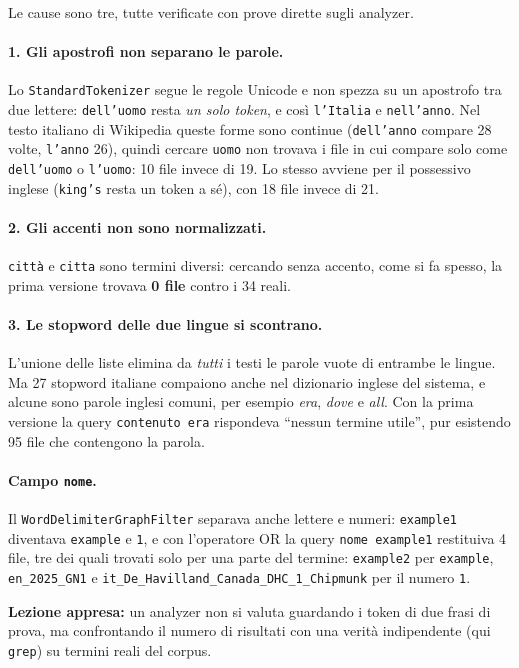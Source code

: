 \documentclass[11pt,a4paper]{article}
\newcommand{\code}[1]{\texttt{#1}}
\newcommand{\field}[1]{\texttt{#1}}
\begin{document}
Le cause sono tre, tutte verificate con prove dirette sugli analyzer.

\paragraph{1. Gli apostrofi non separano le parole.}
Lo \code{StandardTokenizer} segue le regole Unicode e non spezza su un apostrofo
tra due lettere: \code{dell'uomo} resta \emph{un solo token}, e così \code{l'Italia}
e \code{nell'anno}. Nel testo italiano di Wikipedia queste forme sono continue
(\code{dell'anno} compare 28 volte, \code{l'anno} 26), quindi cercare \code{uomo}
non trovava i file in cui compare solo come \code{dell'uomo} o \code{l'uomo}:
10 file invece di 19. Lo stesso avviene per il possessivo inglese
(\code{king's} resta un token a sé), con 18 file invece di 21.

\paragraph{2. Gli accenti non sono normalizzati.}
\code{città} e \code{citta} sono termini diversi: cercando senza accento, come si
fa spesso, la prima versione trovava \textbf{0 file} contro i 34 reali.

\paragraph{3. Le stopword delle due lingue si scontrano.}
L'unione delle liste elimina da \emph{tutti} i testi le parole vuote di entrambe le
lingue. Ma 27 stopword italiane compaiono anche nel dizionario inglese del sistema, e alcune
sono parole inglesi comuni, per esempio \emph{era}, \emph{dove} e \emph{all}.
Con la prima versione la query \code{contenuto era} rispondeva ``nessun termine
utile'', pur esistendo 95 file che contengono la parola.

\paragraph{Campo \field{nome}.}
Il \code{WordDelimiterGraphFilter} separava anche lettere e numeri:
\code{example1} diventava \code{example} e \code{1}, e con l'operatore OR la query
\code{nome example1} restituiva 4 file, tre dei quali trovati solo per una parte del termine:
\code{example2} per \code{example}, \code{en\_2025\_GN1} e
\code{it\_De\_Havilland\_Canada\_DHC\_1\_Chipmunk} per il numero \code{1}.

\medskip
\noindent\textbf{Lezione appresa:} un analyzer non si valuta guardando i token di
due frasi di prova, ma confrontando il numero di risultati con una verità
indipendente (qui \code{grep}) su termini reali del corpus.
\end{document}

